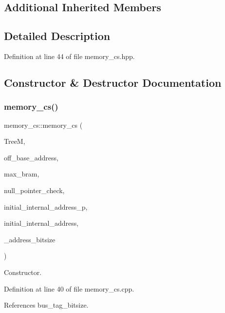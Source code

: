 \subsection*{Additional Inherited Members}


\subsection{Detailed Description}


Definition at line 44 of file memory\+\_\+cs.\+hpp.



\subsection{Constructor \& Destructor Documentation}
\mbox{\label{classmemory__cs_a8f81c2988497f1879527bdb4c37628b4}} 
\subsubsection{\texorpdfstring{memory\+\_\+cs()}{memory\_cs()}}
{\footnotesize\ttfamily memory\+\_\+cs\+::memory\+\_\+cs (\begin{DoxyParamCaption}\item[{const \hyperlink{tree__manager_8hpp_a96ff150c071ce11a9a7a1e40590f205e}{tree\+\_\+manager\+Ref}}]{TreeM,  }\item[{unsigned int}]{off\+\_\+base\+\_\+address,  }\item[{unsigned int}]{max\+\_\+bram,  }\item[{bool}]{null\+\_\+pointer\+\_\+check,  }\item[{bool}]{initial\+\_\+internal\+\_\+address\+\_\+p,  }\item[{unsigned int}]{initial\+\_\+internal\+\_\+address,  }\item[{const unsigned int}]{\+\_\+address\+\_\+bitsize }\end{DoxyParamCaption})}



Constructor. 



Definition at line 40 of file memory\+\_\+cs.\+cpp.



References bus\+\_\+tag\+\_\+bitsize.

